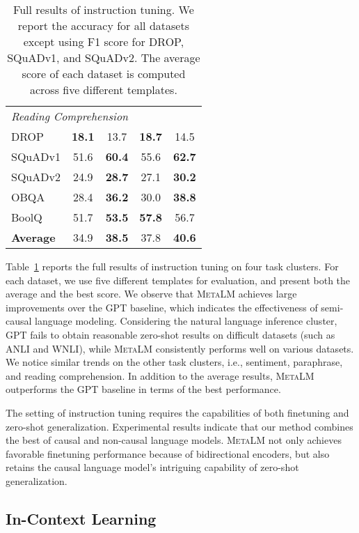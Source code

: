 \documentclass{article}
\theoremstyle{plain}
\theoremstyle{definition}
\theoremstyle{remark}
\newcommand\ours{\textsc{MetaLM}}
\begin{document}
\begin{table}[t]
\begin{tabular}{@{}l c c c c}
 \midrule
 \multicolumn{5}{l}{\textit{{Reading Comprehension}}} \\
DROP & \textbf{18.1} & 13.7 & \textbf{18.7} & 14.5 \\
SQuADv1 & 51.6 & \textbf{60.4} & 55.6 & \textbf{62.7} \\
SQuADv2 & 24.9 & \textbf{28.7} & 27.1 & \textbf{30.2} \\
OBQA & 28.4 & \textbf{36.2} & 30.0 & \textbf{38.8} \\
BoolQ & 51.7 & \textbf{53.5} & \textbf{57.8} & 56.7 \\
\textbf{Average} & 34.9 & \textbf{38.5} & 37.8 & \textbf{40.6} \\

\bottomrule
\end{tabular}
\caption{Full results of instruction tuning. We report the accuracy for all datasets except using F1 score for DROP, SQuADv1, and SQuADv2. The average score of each dataset is computed across five different templates.}
\label{tbl:flan_res}
\end{table}


Table~\ref{tbl:flan_res} reports the full results of instruction tuning on four task clusters.
For each dataset, we use five different templates for evaluation, and present both the average and the best score.
We observe that \ours{} achieves large improvements over the GPT baseline, which indicates the effectiveness of semi-causal language modeling.
Considering the natural language inference cluster, GPT fails to obtain reasonable zero-shot results on difficult datasets (such as ANLI and WNLI), while \ours{} consistently performs well on various datasets.
We notice similar trends on the other task clusters, i.e., sentiment, paraphrase, and reading comprehension.
In addition to the average results, \ours{} outperforms the GPT baseline in terms of the best performance.

The setting of instruction tuning requires the capabilities of both finetuning and zero-shot generalization.
Experimental results indicate that our method combines the best of causal and non-causal language models.
\ours{} not only achieves favorable finetuning performance because of bidirectional encoders, but also retains the causal language model's intriguing capability of zero-shot generalization.


\subsection{In-Context Learning}
\label{sec:lang:fewshot}
\end{document}
